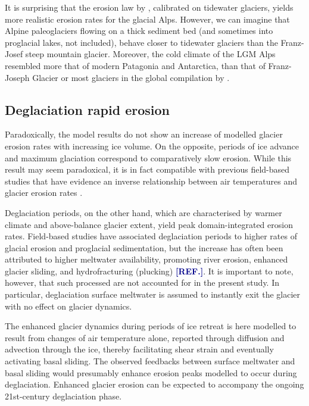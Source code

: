 \documentclass[utf8]{article}
\newcommand{\aref}[0]{\textcolor{darkblue}{\textbf{[REF.]}}}
\begin{document}
    It is surprising that the erosion law by \citet{Koppes.etal.2015},
    calibrated on tidewater glaciers, yields more realistic erosion rates for
    the glacial Alps. However, we can imagine that Alpine paleoglaciers
    flowing on a thick sediment bed (and sometimes into proglacial lakes, not
    included), behave closer to tidewater glaciers than the Franz-Josef steep
    mountain glacier. Moreover, the cold climate of the LGM Alps resembled more
    that of modern Patagonia and Antarctica, than that of Franz-Joseph Glacier
    or most glaciers in the global compilation by \citet{Cook.etal.2020}.

\subsection{Deglaciation rapid erosion}

    Paradoxically, the model results do not show an increase of modelled
    glacier erosion rates with increasing ice volume.  On the opposite, periods
    of ice advance and maximum glaciation correspond to comparatively slow
    erosion. While this result may seem paradoxical, it is in fact
    compatible with previous field-based studies that have evidence an inverse
    relationship between air temperatures and glacier erosion rates
    \citep{Koppes.etal.2015, Cook.etal.2020}.

    Deglaciation periods, on the other hand, which are characterised by warmer
    climate and above-balance glacier extent, yield peak domain-integrated
    erosion rates. Field-based studies have associated deglaciation periods to
    higher rates of glacial erosion and proglacial sedimentation, but the increase
    has often been attributed to higher meltwater availability, promoting river
    erosion, enhanced glacier sliding, and hydrofracturing (plucking) \aref. It
    is important to note, however, that such processed are not accounted for in
    the present study. In particular, deglaciation surface meltwater is assumed
    to instantly exit the glacier with no effect on glacier dynamics.

    The enhanced glacier dynamics during periods of ice retreat is here
    modelled to result from changes of air temperature alone, reported through
    diffusion and advection through the ice, thereby facilitating shear strain
    and eventually activating basal sliding. The observed feedbacks between
    surface meltwater and basal sliding would presumably enhance erosion peaks
    modelled to occur during deglaciation. Enhanced glacier erosion can be
    expected to accompany the ongoing 21st-century deglaciation phase.
\end{document}
